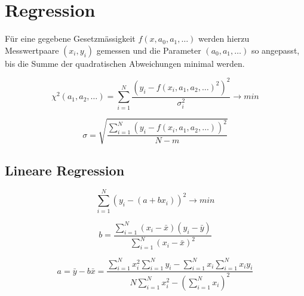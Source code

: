 \section{Regression}

F\"ur eine gegebene Gesetzm\"assigkeit $f(x, a_0, a_1, \ldots)$ werden hierzu Messwertpaare
$(x_i, y_i)$ gemessen und die Parameter $(a_0, a_1, \ldots)$ so angepasst, bis die Summe der quadratischen
Abweichungen minimal werden.

\[ \chi^2(a_1, a_2, \ldots) = \sum_{i=1}^{N} \frac{(y_i - f(x_i, a_1, a_2, \ldots)^2)^2}{\sigma_i^2} \to min \]

\[ \sigma = \sqrt{ \frac{\sum_{i=1}^{N} (y_i - f(x_i, a_1, a_2, \ldots))^2}{N-m} } \]

\subsection{Lineare Regression}

\[ \sum_{i=1}^{N} (y_i - (a + bx_i))^2 \to min \]

\[ b = \frac{ \sum_{i=1}^{N} (x_i - \bar{x})(y_i - \bar{y}) }{ \sum_{i=1}^{N} (x_i - \bar{x})^2 } \]

\[ a = \bar{y} - b \bar{x} = \frac{ \sum_{i=1}^{N} x_i^2 \sum_{i=1}^{N} y_i - \sum_{i=1}^{N} x_i \sum_{i=1}^{N} x_i y_i }{ N \sum_{i=1}^{N} x_i^2 - (\sum_{i=1}^{N} x_i)^2 } \]

